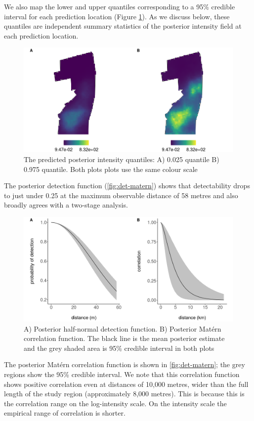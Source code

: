 \documentclass{stylefile16/statsoc}
\begin{document}
We also map the lower and upper quantiles corresponding to a 95\% credible interval for each prediction location (Figure \ref{fig:intensity-quantiles}).  As we discuss below, these quantiles are independent summary statistics of the posterior intensity field at each prediction location.  
\begin{figure}[!htb]
	\begin{center}
		\includegraphics[scale=0.525]{figures/intensity_quantiles.png}
		\caption{The predicted posterior intensity quantiles:  A) 0.025 quantile B) 0.975 quantile.  Both plots plots use the same colour scale}
		\label{fig:intensity-quantiles}
	\end{center}
\end{figure}

The posterior detection function (\autoref{fig:det-matern}) shows that detectability drops to just under 0.25 at the maximum observable distance of 58 metres and also broadly agrees with a two-stage analysis.
\begin{figure}[!htb]
	\begin{center}
		\includegraphics[scale=0.525]{figures/detfn_and_matern.png}
		\caption{A) Posterior half-normal detection function. B) Posterior Mat\'ern correlation function.  The black line is the mean posterior estimate and the grey shaded area is 95\% credible interval in both plots}
		\label{fig:det-matern}
	\end{center}
\end{figure}
The posterior Mat\'ern correlation function is shown in \autoref{fig:det-matern}; the grey regions show the 95\% credible interval.  We note that this correlation function shows positive correlation even at distances of 10,000 metres, wider than the full length of the study region (approximately 8,000 metres).  This is because this is the correlation range on the log-intensity scale.  On the intensity scale the empirical range of correlation is shorter.
\end{document}
